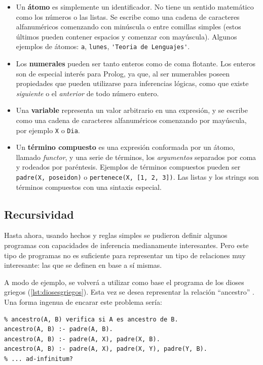 \documentclass[12pt,titlepage]{article}
\begin{document}
\begin{itemize}
    \item Un \textbf{átomo} es simplemente un identificador. No tiene un sentido matemático como los números o las listas. Se escribe como una cadena de caracteres alfanuméricos comenzando con minúscula o entre comillas simples (estos últimos pueden contener espacios y comenzar con mayúscula). Algunos ejemplos de átomos: \lstinline|a|, \lstinline|lunes|, \lstinline|'Teoria de Lenguajes'|.
    \item Los \textbf{numerales} pueden ser tanto enteros como de coma flotante. Los enteros son de especial interés para Prolog, ya que, al ser numerables poseen propiedades que pueden utilizarse para inferencias lógicas, como que existe \emph{siguiente} o el \emph{anterior} de todo número entero.
    \item Una \textbf{variable} representa un valor arbitrario en una expresión, y se escribe como una cadena de caracteres alfanuméricos comenzando por mayúscula, por ejemplo \lstinline|X| o \lstinline|Dia|.
    \item Un \textbf{término compuesto} es una expresión conformada por un átomo, llamado \emph{functor}, y una serie de términos, los \emph{argumentos} separados por coma y rodeados por paréntesis. Ejemplos de términos compuestos pueden ser \lstinline|padre(X, poseidon)| o \lstinline|pertenece(X, [1, 2, 3])|. Las listas y los strings son términos compuestos con una sintaxis especial.
\end{itemize}

\subsection{Recursividad}
\label{sec:recursividad}

Hasta ahora, usando hechos y reglas simples se pudieron definir algunos programas con capacidades de inferencia medianamente interesantes. Pero este tipo de programas no es suficiente para representar un tipo de relaciones muy interesante: las que se definen en base a sí mismas.

A modo de ejemplo, se volverá a utilizar como base el programa de los dioses griegos (\ref{lst:diosesgriegos}). Esta vez se desea representar la relación ``ancestro'' . Una forma ingenua de encarar este problema sería:
\begin{lstlisting}
% ancestro(A, B) verifica si A es ancestro de B.
ancestro(A, B) :- padre(A, B).
ancestro(A, B) :- padre(A, X), padre(X, B).
ancestro(A, B) :- padre(A, X), padre(X, Y), padre(Y, B).
% ... ad-infinitum?
\end{lstlisting}
\end{document}
